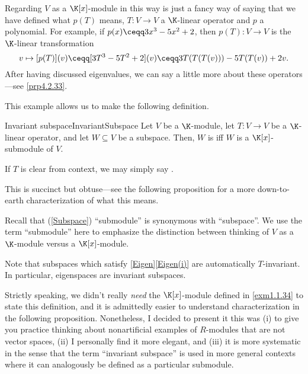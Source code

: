 Regarding $V$ as a $\K [x]$-module in this way is just a fancy way of saying that we have defined what $p(T)$ means, $T\colon V\rightarrow V$ a $\K$-linear operator and $p$ a polynomial.  For example, if $p(x)\ceqq 3x^3-5x^2+2$, then $p(T)\colon V\rightarrow V$ is the $\K$-linear transformation
\begin{equation}
v\mapsto [p(T)](v)\ceqq [3T^3-5T^2+2](v)\ceqq 3T(T(T(v)))-5T(T(v))+2v.
\end{equation}
After having discussed eigenvalues, we can say a little more about these operators---see \cref{prp4.2.33}.

This example allows us to make the following definition.
\begin{dfn}{Invariant subspace}{InvariantSubspace}
	Let $V$ be a $\K$-module, let $T\colon V\rightarrow V$ be a $\K$-linear operator, and let $W\subseteq V$ be a subspace.  Then, $W$ is  iff $W$ is a $\K [x]$-submodule of $V$.
	\begin{rmk}
		If $T$ is clear from context, we may simply say .
	\end{rmk}
	\begin{rmk}
		This is succinct but obtuse---see the following proposition for a more down-to-earth characterization of what this means.
	\end{rmk}
	\begin{rmk}
		Recall that (\cref{Subspace}) ``submodule'' is synonymous with ``subspace''.  We use the term ``submodule'' here to emphasize the distinction between thinking of $V$ as a $\K$-module versus a $\K [x]$-module.
	\end{rmk}
	\begin{rmk}
		Note that subspaces which satisfy \cref{Eigen}\cref{Eigen(i)} are automatically $T$-invariant.  In particular, eigenspaces are invariant subspaces.
	\end{rmk}
	\begin{rmk}
		Strictly speaking, we didn't really \emph{need} the $\K [x]$-module defined in \cref{exm1.1.34} to state this definition, and it is admittedly easier to understand characterization in the following proposition.  Nonetheless, I decided to present it this was (i) to give you practice thinking about nonartificial examples of $R$-modules that are not vector spaces, (ii) I personally find it more elegant, and (iii) it is more systematic in the sense that the term ``invariant subspace'' is used in more general contexts where it can analogously be defined as a particular submodule.
	\end{rmk}
\end{dfn}
